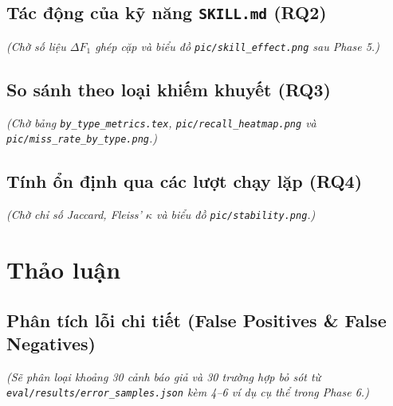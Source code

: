 \documentclass[12pt,a4paper]{report}
\begin{document}
\section{Tác động của kỹ năng \texttt{SKILL.md} (RQ2)}
\textit{(Chờ số liệu $\Delta F_1$ ghép cặp và biểu đồ \texttt{pic/skill\_effect.png} sau Phase 5.)}

\section{So sánh theo loại khiếm khuyết (RQ3)}
\textit{(Chờ bảng \texttt{by\_type\_metrics.tex}, \texttt{pic/recall\_heatmap.png} và \texttt{pic/miss\_rate\_by\_type.png}.)}

\section{Tính ổn định qua các lượt chạy lặp (RQ4)}
\textit{(Chờ chỉ số Jaccard, Fleiss' $\kappa$ và biểu đồ \texttt{pic/stability.png}.)}

\chapter{Thảo luận}

\section{Phân tích lỗi chi tiết (False Positives \& False Negatives)}
\textit{(Sẽ phân loại khoảng 30 cảnh báo giả và 30 trường hợp bỏ sót từ \texttt{eval/results/error\_samples.json} kèm 4--6 ví dụ cụ thể trong Phase 6.)}
\end{document}
